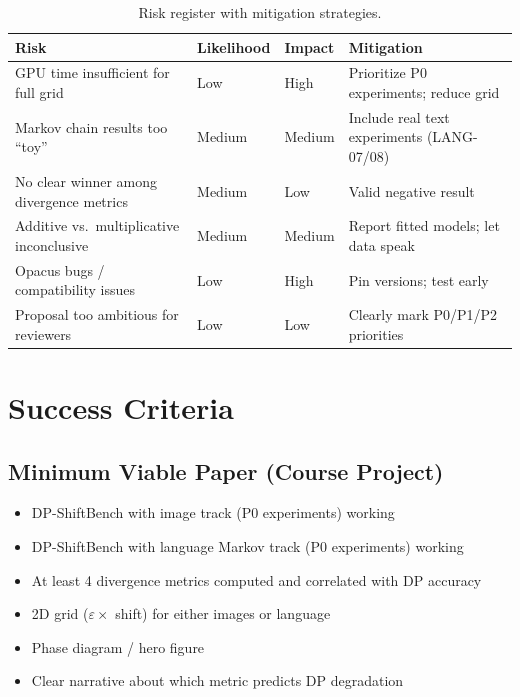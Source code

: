 \documentclass[11pt,a4paper]{article}
\begin{document}
\begin{table}[h]
\centering
\begin{tabularx}{\textwidth}{@{}Xllp{4.5cm}@{}}
\toprule
\textbf{Risk} & \textbf{Likelihood} & \textbf{Impact} & \textbf{Mitigation} \\
\midrule
GPU time insufficient for full grid & Low & High & Prioritize P0 experiments; reduce grid \\
Markov chain results too ``toy'' & Medium & Medium & Include real text experiments (LANG-07/08) \\
No clear winner among divergence metrics & Medium & Low & Valid negative result \\
Additive vs.\ multiplicative inconclusive & Medium & Medium & Report fitted models; let data speak \\
Opacus bugs / compatibility issues & Low & High & Pin versions; test early \\
Proposal too ambitious for reviewers & Low & Low & Clearly mark P0/P1/P2 priorities \\
\bottomrule
\end{tabularx}
\caption{Risk register with mitigation strategies.}
\end{table}

\section{Success Criteria}

\subsection{Minimum Viable Paper (Course Project)}

\begin{itemize}[nosep]
    \item[$\square$] DP-ShiftBench with image track (P0 experiments) working
    \item[$\square$] DP-ShiftBench with language Markov track (P0 experiments) working
    \item[$\square$] At least 4 divergence metrics computed and correlated with DP accuracy
    \item[$\square$] 2D grid ($\varepsilon \times$ shift) for either images or language
    \item[$\square$] Phase diagram / hero figure
    \item[$\square$] Clear narrative about which metric predicts DP degradation
\end{itemize}
\end{document}
